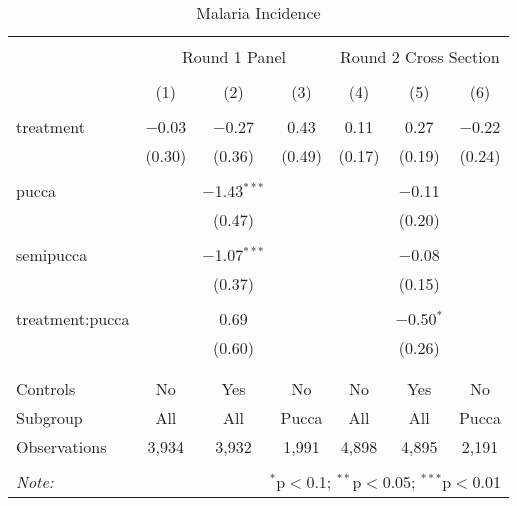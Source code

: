 
\begin{table}[!htbp] \centering 
  \caption{Malaria Incidence} 
  \label{tbl:Malaria Incidence} 
\begin{tabular}{@{\extracolsep{5pt}}lcccccc} 
\\[-1.8ex]\hline 
\hline \\[-1.8ex] 
 & \multicolumn{3}{c}{Round 1 Panel} & \multicolumn{3}{c}{Round 2 Cross Section} \\ 
\\[-1.8ex] & (1) & (2) & (3) & (4) & (5) & (6)\\ 
\hline \\[-1.8ex] 
 treatment & $-$0.03 & $-$0.27 & 0.43 & 0.11 & 0.27 & $-$0.22 \\ 
  & (0.30) & (0.36) & (0.49) & (0.17) & (0.19) & (0.24) \\ 
  & & & & & & \\ 
 pucca &  & $-$1.43$^{***}$ &  &  & $-$0.11 &  \\ 
  &  & (0.47) &  &  & (0.20) &  \\ 
  & & & & & & \\ 
 semipucca &  & $-$1.07$^{***}$ &  &  & $-$0.08 &  \\ 
  &  & (0.37) &  &  & (0.15) &  \\ 
  & & & & & & \\ 
 treatment:pucca &  & 0.69 &  &  & $-$0.50$^{*}$ &  \\ 
  &  & (0.60) &  &  & (0.26) &  \\ 
  & & & & & & \\ 
\hline \\[-1.8ex] 
Controls & No & Yes & No & No & Yes & No \\ 
Subgroup & All & All & Pucca & All & All & Pucca \\ 
Observations & 3,934 & 3,932 & 1,991 & 4,898 & 4,895 & 2,191 \\ 
\hline 
\hline \\[-1.8ex] 
\textit{Note:}  & \multicolumn{6}{r}{$^{*}$p$<$0.1; $^{**}$p$<$0.05; $^{***}$p$<$0.01} \\ 
\end{tabular} 
\end{table} 

